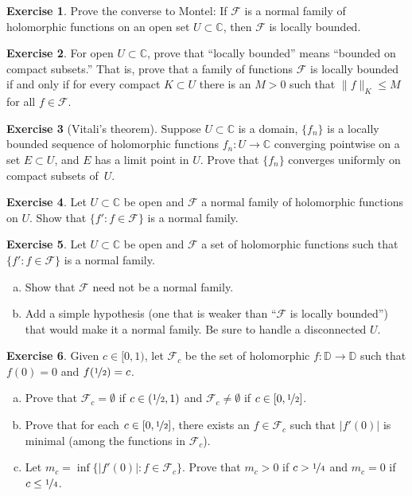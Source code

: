 \documentclass[12pt,openany]{book}
\newcommand{\sabs}[1]{\lvert {#1} \rvert}
\newcommand{\snorm}[1]{\lVert {#1} \rVert}
\newcommand{\C}{{\mathbb{C}}}
\newcommand{\D}{{\mathbb{D}}}
\newcommand{\sF}{{\mathscr{F}}}
\newcommand{\myquote}[1]{``#1''}
\theoremstyle{plain}
\theoremstyle{remark}
\theoremstyle{definition}
\newenvironment{exbox}{%
    \def\FrameCommand{\vrule width 1pt \relax\hspace{10pt}}%
    \MakeFramed{\advance\hsize-\width\FrameRestore}%
}{%
    \endMakeFramed
}
\newenvironment{exparts}{%
    \leavevmode\begin{enumerate}[a),noitemsep,topsep=0pt,parsep=0pt,partopsep=0pt]
}{%
    \end{enumerate}
}
\theoremstyle{exercise}
\newtheorem{exercise}{Exercise}[section]
\theoremstyle{example}
\begin{document}
\begin{exbox}
\begin{exercise}
Prove the converse to Montel:
If $\sF$ is a normal family of holomorphic functions on an open set $U \subset \C$,
then $\sF$ is locally bounded.
\end{exercise}

\begin{exercise}
For open $U \subset \C$,
prove that \myquote{locally bounded} means
\myquote{bounded on compact subsets.}
That is, prove that a family of functions $\sF$ is locally bounded if and only if
for every compact $K \subset U$ there is an $M >0$ such that
$\snorm{f}_K \leq M$ for all $f \in \sF$.
\end{exercise}

\begin{exercise}[Vitali's theorem]
Suppose $U \subset \C$ is a domain, $\{ f_n \}$ is a locally bounded
sequence of holomorphic functions $f_n \colon U \to \C$
converging pointwise on a set $E \subset U$,
and $E$ has a limit point in $U$.  Prove that $\{ f_n \}$
converges uniformly on compact subsets of~$U$.
\end{exercise}

\begin{exercise}
Let $U \subset \C$ be open and $\sF$ a normal family of
holomorphic functions on $U$.
Show that $\{ f' : f \in \sF \}$ is a normal family.
\end{exercise}

\begin{exercise}
Let $U \subset \C$ be open and $\sF$ a set of holomorphic
functions such that $\{ f' : f \in \sF \}$ is a normal family.
\begin{exparts}
\item
Show that $\sF$ need not be a normal family.
\item
Add a simple
hypothesis (one that is weaker than \myquote{$\sF$ is locally bounded})
that would make it a normal family.
Be sure to handle a disconnected $U$.
\end{exparts}
\end{exercise}

\begin{exercise}
Given $c \in [0,1)$, let $\sF_c$ be the set of holomorphic
$f \colon \D \to \D$ such that $f(0) = 0$ and $f(\nicefrac{1}{2}) = c$.
\begin{exparts}
\item
Prove that
$\sF_c = \emptyset$ if $c \in (\nicefrac{1}{2},1)$
and
$\sF_c \neq \emptyset$ if $c \in [0,\nicefrac{1}{2}]$.
\item
Prove that for each $c \in [0,\nicefrac{1}{2}]$, there exists an
$f \in \sF_c$
such that $\sabs{f'(0)}$ is minimal (among the functions in $\sF_c$).
\item
Let $m_c = \inf \bigl\{ \sabs{f'(0)} : f \in \sF_c \bigr\}$.
Prove that $m_c > 0$ if $c > \nicefrac{1}{4}$ and $m_c = 0$ if $c \leq \nicefrac{1}{4}$.
\end{exparts}
\end{exercise}


\end{exbox}
\end{document}

